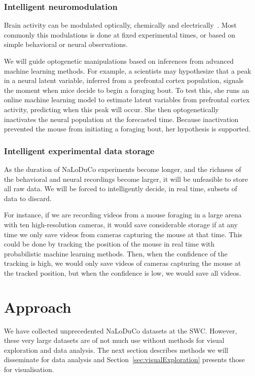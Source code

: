 \documentclass[12pt]{article}
\begin{document}
\subsubsection*{Intelligent neuromodulation}

Brain activity can be modulated optically, chemically and
electrically~\citep{}.
%
Most commonly this modulations is done at fixed experimental times, or based on
simple behavioral or neural observations.

We will guide optogenetic manipulations based on inferences from advanced
machine learning methods.
%
For example, a scientists may hypothesize that a peak in a neural latent
variable, inferred from a prefrontal cortex population, signals the moment when
mice decide to begin a foraging bout.  To test this, she runs an online machine
learning model to estimate latent variables from prefrontal cortex activity,
predicting when this peak will occur. She then optogenetically inactivates the
neural population at the forecasted time.  Because inactivation prevented the
mouse from initiating a foraging bout, her hypothesis is supported.

\subsubsection*{Intelligent experimental data storage}

As the duration of NaLoDuCo experiments become longer, and the richness of the
behavioral and neural recordings become larger, it will be unfeasible to
store all raw data. We will be forced to intelligently decide, in real time,
subsets of data to discard.

For instance, if we are recording videos from a mouse foraging in a large arena
with ten high-resolution cameras, it would save considerable storage if at any
time we only save videos from cameras capturing the mouse at that time.  This
could be done by tracking the position of the mouse in real time with
probabilistic machine learning methods. Then, when the confidence of the
tracking is high, we would only save videos of cameras capturing the mouse at
the tracked position, but when the confidence is low, we would save all videos.

\section{Approach}

We have collected unprecedented NaLoDuCo datasets at the SWC. However, these
very large datasets are of not much use without methods for visual exploration
and data analysis. The next section describes methods we will disseminate for
data analysis and Section~\ref{sec:visualExploration} presents those for
visualisation.
\end{document}
